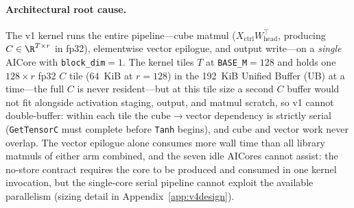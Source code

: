 \paragraph{Architectural root cause.}
The v1 kernel runs the entire pipeline---cube matmul
($X_{\mathrm{ctrl}} W_{\mathrm{head}}^\top$, producing $C\in\R^{T\times r}$ in fp32),
elementwise vector epilogue, and output write---on a \emph{single} AICore
with \texttt{block\_dim}$=1$.  The kernel tiles $T$ at
\texttt{BASE\_M}$=128$ and holds one $128\times r$ fp32 $C$ tile
($64$~KiB at $r{=}128$) in the 192~KiB Unified Buffer (UB) at a
time---the full $C$ is never resident---but at this tile size a second
$C$ buffer would not fit alongside activation staging, output, and
matmul scratch, so v1 cannot double-buffer: within each tile the
cube$\to$vector dependency is strictly serial (\texttt{GetTensorC} must
complete before \texttt{Tanh} begins), and cube and vector work never
overlap.  The vector epilogue alone
consumes more wall time than all library matmuls of either arm combined,
and the seven idle AICores cannot assist: the no-store contract requires
the core to be produced and consumed in one kernel invocation, but the
single-core serial pipeline cannot exploit the available parallelism
(sizing detail in Appendix~\ref{app:v4design}).

